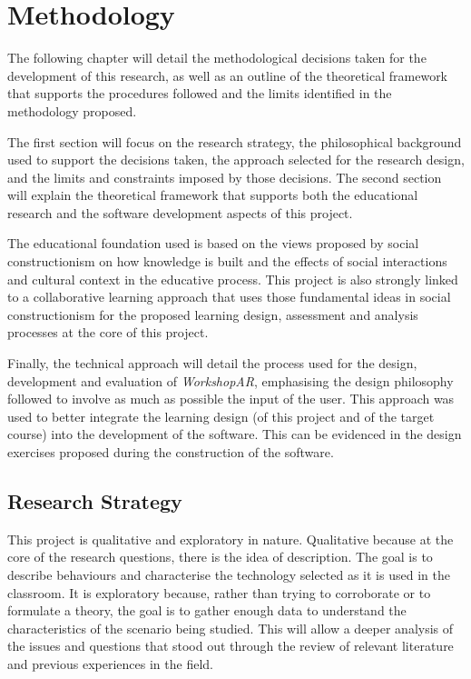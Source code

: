 \chapter{Methodology \label{ch3}}

The following chapter will detail the methodological decisions taken for the development of this research, as well as an outline of the theoretical framework that supports the
procedures followed and the limits identified in the methodology proposed.

The first section will focus on the research strategy, the philosophical background used to support the decisions taken, the approach selected for the research design, and the
limits and constraints imposed by those decisions. The second section will explain the theoretical framework that supports both the educational research and the software development
aspects of this project.

The educational foundation used is based on the views proposed by social constructionism on how knowledge is built and the effects of social interactions and cultural context in the
educative process. This project is also strongly linked to a collaborative learning approach that uses those fundamental ideas in social constructionism for the proposed learning design,
assessment and analysis processes at the core of this project.

Finally, the technical approach will detail the process used for the design, development and evaluation of \emph{WorkshopAR},  emphasising the design philosophy followed to involve as much
as possible the input of the user. This approach was used to better integrate the learning design (of this project and of the target course) into the development of the software. This can be
evidenced in the design exercises proposed during the construction of the software.

\section{Research Strategy \label{sec:3-1}}

This project is qualitative and exploratory in nature. Qualitative because at the core of the research questions, there is the idea of description. The goal is to describe
behaviours and characterise the technology selected as it is used in the classroom. It is exploratory because, rather than trying to corroborate or to formulate a theory, the
goal is to gather enough data to understand the characteristics of the scenario being studied. This will allow a deeper analysis of the issues and questions that stood out through
the review of relevant literature and previous experiences in the field.

